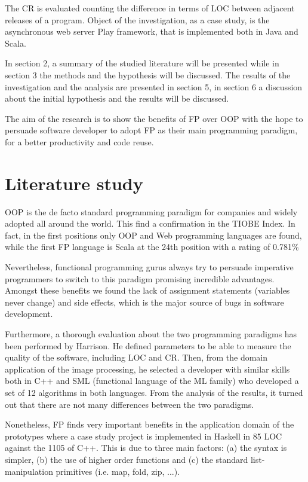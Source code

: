 \documentclass{proc}
\begin{document}
The CR is evaluated counting the difference in terms of LOC between adjacent releases of a program. Object of the investigation, as a case study, is the asynchronous web server Play framework\cite{play}, that is implemented both in Java and Scala.

In section 2, a summary of the studied literature will be presented while in section 3 the methods and the hypothesis will be discussed. The results of the investigation and the analysis are presented in section 5, in section 6 a discussion about the initial hypothesis and the results will be discussed.

The aim of the research is to show the benefits of FP over OOP with the hope to persuade software developer to adopt FP as their main programming paradigm, for a better productivity and code reuse. 

\section{Literature study}

OOP is the de facto standard programming paradigm for companies and widely adopted all around the world. This find a confirmation in the TIOBE Index\cite{tiobe}. In fact, in the first positions only OOP and Web programming languages are found, while the first FP language is Scala at the 24th position with a rating of 0.781\%

Nevertheless, functional programming gurus always try to persuade imperative programmers to switch to this paradigm promising incredible advantages. Amongst these benefits we found the lack of assignment statements (variables never change) and side effects, which is the major source of bugs in software development\cite{fpmatter}.

Furthermore, a thorough evaluation about the two programming paradigms has been performed by Harrison\cite{harrison}. He defined parameters to be able to measure the quality of the software, including LOC and CR. Then, from the domain application of the image processing, he selected a developer with similar skills both in C++ and SML (functional language of the ML family) who developed a set of 12 algorithms in both languages. From the analysis of the results, it turned out that there are not many differences between the two paradigms.

Nonetheless, FP finds very important benefits in the application domain of the prototypes where a case study project is implemented in Haskell in 85 LOC against the 1105 of C++\cite{Haskell-vs-ada}. This is due to three main factors: (a) the syntax is simpler, (b) the use of higher order functions and (c) the standard list-manipulation primitives (i.e. map, fold, zip, ...).
\end{document}
